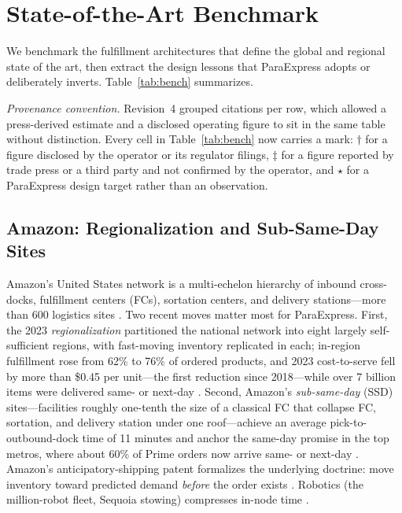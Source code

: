 \section{State-of-the-Art Benchmark}\label{sec:bench}

We benchmark the fulfillment architectures that define the global and regional state of the art, then extract the design lessons that ParaExpress adopts or deliberately inverts. Table~\ref{tab:bench} summarizes.

\emph{Provenance convention.} Revision~4 grouped citations per row, which allowed a press-derived estimate and a disclosed operating figure to sit in the same table without distinction. Every cell in Table~\ref{tab:bench} now carries a mark: $\dagger$ for a figure disclosed by the operator or its regulator filings, $\ddagger$ for a figure reported by trade press or a third party and not confirmed by the operator, and $\star$ for a ParaExpress design target rather than an observation.

\subsection{Amazon: Regionalization and Sub-Same-Day Sites}
Amazon's United States network is a multi-echelon hierarchy of inbound cross-docks, fulfillment centers (FCs), sortation centers, and delivery stations---more than 600 logistics sites \cite{redstag}. Two recent moves matter most for ParaExpress. First, the 2023 \emph{regionalization} partitioned the national network into eight largely self-sufficient regions, with fast-moving inventory replicated in each; in-region fulfillment rose from 62\% to 76\% of ordered products, and 2023 cost-to-serve fell by more than \$0.45 per unit---the first reduction since 2018---while over 7 billion items were delivered same- or next-day \cite{chandra2026,amazonscience,supplychaindive2023}. Second, Amazon's \emph{sub-same-day} (SSD) sites---facilities roughly one-tenth the size of a classical FC that collapse FC, sortation, and delivery station under one roof---achieve an average pick-to-outbound-dock time of 11 minutes and anchor the same-day promise in the top metros, where about 60\% of Prime orders now arrive same- or next-day \cite{costar2024,palmer2024}. Amazon's anticipatory-shipping patent formalizes the underlying doctrine: move inventory toward predicted demand \emph{before} the order exists \cite{spiegel2013}. Robotics (the million-robot fleet, Sequoia stowing) compresses in-node time \cite{amazon2023robots,techcrunch2025}.


